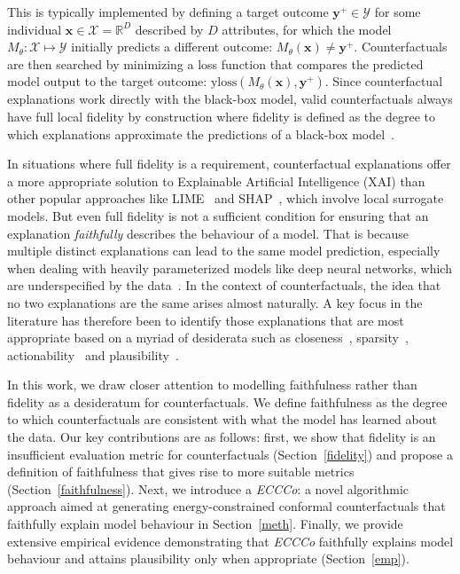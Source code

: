 \documentclass[letterpaper]{article} %
\begin{document}
This is typically implemented by defining a target outcome $\mathbf{y}^+ \in \mathcal{Y}$ for some individual $\mathbf{x} \in \mathcal{X}=\mathbb{R}^D$ described by $D$ attributes, for which the model $M_{\theta}:\mathcal{X}\mapsto\mathcal{Y}$ initially predicts a different outcome: $M_{\theta}(\mathbf{x})\ne \mathbf{y}^+$. Counterfactuals are then searched by minimizing a loss function that compares the predicted model output to the target outcome: $\text{yloss}(M_{\theta}(\mathbf{x}),\mathbf{y}^+)$. Since counterfactual explanations work directly with the black-box model, valid counterfactuals always have full local fidelity by construction where fidelity is defined as the degree to which explanations approximate the predictions of a black-box model~\citep{molnar2022interpretable}. 

In situations where full fidelity is a requirement, counterfactual explanations offer a more appropriate solution to Explainable Artificial Intelligence (XAI) than other popular approaches like LIME~\citep{ribeiro2016why} and SHAP~\citep{lundberg2017unified}, which involve local surrogate models. But even full fidelity is not a sufficient condition for ensuring that an explanation \textit{faithfully} describes the behaviour of a model. That is because multiple distinct explanations can lead to the same model prediction, especially when dealing with heavily parameterized models like deep neural networks, which are underspecified by the data~\citep{wilson2020case}. In the context of counterfactuals, the idea that no two explanations are the same arises almost naturally. A key focus in the literature has therefore been to identify those explanations that are most appropriate based on a myriad of desiderata such as closeness~\citep{wachter2017counterfactual}, sparsity~\citep{schut2021generating}, actionability~\citep{ustun2019actionable} and plausibility~\citep{joshi2019realistic}. 

In this work, we draw closer attention to modelling faithfulness rather than fidelity as a desideratum for counterfactuals. We define faithfulness as the degree to which counterfactuals are consistent with what the model has learned about the data. Our key contributions are as follows: first, we show that fidelity is an insufficient evaluation metric for counterfactuals (Section~\ref{fidelity}) and propose a definition of faithfulness that gives rise to more suitable metrics (Section~\ref{faithfulness}). Next, we introduce a \textit{ECCCo}: a novel algorithmic approach aimed at generating energy-constrained conformal counterfactuals that faithfully explain model behaviour in Section~\ref{meth}. Finally, we provide extensive empirical evidence demonstrating that \textit{ECCCo} faithfully explains model behaviour and attains plausibility only when appropriate (Section~\ref{emp}).
\end{document}
